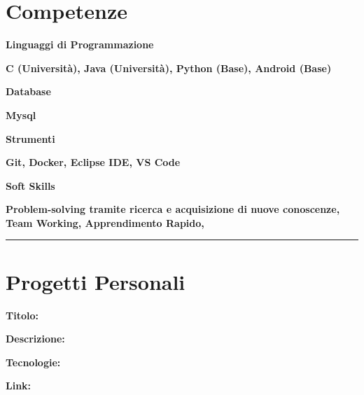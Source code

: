 \documentclass{article}
\newenvironment{listaIdentazione}[1]{
			\begin{list}{}{
			  \setlength{\leftmargin}{#1} %
			  \setlength{\itemsep}{0pt}	%
			  \setlength{\parskip}{0pt} %
			  \setlength{\parsep}{0pt} %
			  \setlength{\labelwidth}{0pt} %
			  \setlength{\labelsep}{0pt} %
			  \renewcommand{\makelabel}[1]{} %
			  }
			}{\end{list}}
\newcommand{\spaziocorto}{\\[0.1cm]}
\newcommand{\spaziolungo}{\\[0.3cm]}
\begin{document}
\section*{\LARGE{Competenze}}
\begin{flushleft}
		\textbf{\Large{Linguaggi di Programmazione}}
		\spaziocorto
			\begin{listaIdentazione}{0.5cm}
			\item{\textbf{\Large{C (Università), Java (Università), Python (Base),
			Android (Base)}}}
			\spaziocorto
			\end{listaIdentazione}
						
		\textbf{\Large{Database}}
		\spaziocorto
			\begin{listaIdentazione}{0.5cm}
			\item{\textbf{\Large{Mysql}}}
			\spaziocorto
			\end{listaIdentazione}
			
		\textbf{\Large{Strumenti}}
		\spaziocorto
			\begin{listaIdentazione}{0.5cm}
			\item{\textbf{\Large{Git, Docker, Eclipse IDE, VS Code}}}
			\spaziocorto
			\end{listaIdentazione}
			
		\textbf{\Large{Soft Skills}}
		\spaziocorto
			\begin{listaIdentazione}{0.5cm}
			\item{\textbf{\Large{Problem-solving tramite ricerca e acquisizione di nuove conoscenze, Team Working, Apprendimento Rapido, }}}
			\spaziocorto
			\end{listaIdentazione}
\end{flushleft}

\hrule

\section*{\LARGE{Progetti Personali}}
	\begin{flushleft}
		\textbf{\Large{Titolo: }}
		\spaziocorto
			\begin{listaIdentazione}{0.5cm}
			\item {\textbf{\Large{Descrizione: }}}
			\spaziocorto
			\item {\textbf{\Large{Tecnologie: }}}
			\spaziocorto
			\item {\textbf{\Large{Link: }}}
			\spaziolungo
			\end{listaIdentazione}
\end{flushleft}
\end{document}
